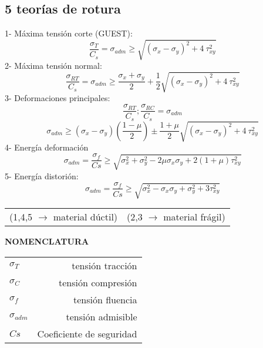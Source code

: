 \documentclass[11pt,a4paper]{article}
\begin{document}
\pagestyle{pieyencabezado}

\begin{multicols}{2}	
	\begin{cajita}
		\section*{5 teorías de rotura}
		\begin{flushleft}
			1- Máxima tensión corte (GUEST):
			\begin{equation*}
				\dfrac{\sigma_{T}}{C_{s}}=\sigma_{adm}\geq\sqrt{(\sigma_{x}-\sigma_{y})^{2}+4~\tau_{xy}^{2}}
			\end{equation*}
			2- Máxima tensión normal:
			\begin{equation*}
				\dfrac{\sigma_{RT}}{C_{s}}=\sigma_{adm}\geq\dfrac{\sigma_{x}+\sigma_{y}}{2}+\dfrac{1}{2}\sqrt{(\sigma_{x}-\sigma_{y})^{2}+4~\tau_{xy}^{2}}
			\end{equation*}
			3- Deformaciones principales:
			\begin{equation*}
				\dfrac{\sigma_{RT}}{C_{s}};\dfrac{\sigma_{RC}}{C_{s}}=\sigma_{adm}
			\end{equation*}
			\begin{equation*}
				\sigma_{adm}\geq(\sigma_{x}-\sigma_{y})\left(\dfrac{1-\mu}{2}\right)\pm\dfrac{1+\mu}{2}\sqrt{(\sigma_{x}-\sigma_{y})^{2}+4~\tau_{xy}^{2}}
			\end{equation*}
			4- Energía deformación
			\begin{equation*}
				\sigma_{adm}=\dfrac{\sigma_{f}}{Cs}\geq\sqrt{\sigma_{x}^{2}+\sigma_{y}^{2}-2\mu \sigma_{x} \sigma_{y} +2(1+\mu)\tau_{xy}^{2}}
			\end{equation*}
			5- Energía distorión:
			\begin{equation*}
				\sigma_{adm}=\dfrac{\sigma_{f}}{Cs}\geq\sqrt{\sigma_{x}^{2}-\sigma_{x} \sigma_{y}+\sigma_{y}^{2}+3\tau_{xy}^{2}}			
			\end{equation*}
		\end{flushleft}
			\begin{tabular}{l r}
				(1,4,5 $\rightarrow$ material dúctil) & (2,3 $\rightarrow$ material frágil)
			\end{tabular}
		

	\begin{cajita}
		\textbf{NOMENCLATURA}
		\begin{tabular}{l r}
			$\sigma_{T}$&tensión tracción \\
			$\sigma_{C}$&tensión compresión\\
			$\sigma_{f}$&tensión fluencia\\
			$\sigma_{adm}$&tensión admisible\\
			$Cs$&Coeficiente de seguridad\\
		\end{tabular}
	\end{cajita}
	\end{cajita}


\end{multicols}
\end{document}
